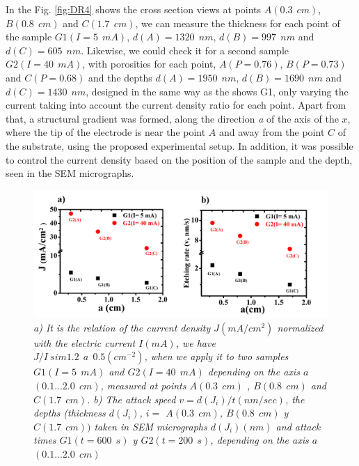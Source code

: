 \documentclass{article}
\begin{document}
In the Fig. \ref{fig:DR4} shows the cross section views   at points $
A (0.3 \ \ cm) $, $ B (0.8 \ \ cm) $ and $ C (1.7 \ \ cm) $, we can
measure the thickness for each point of the sample $ G1 (I = 5 \ \ mA)
$, $ d (A) = 1320 \ \ nm $, $ d (B) = 997 \ \ nm $ and $ d (C) = 605 \
\ nm $. Likewise, we could check it for a second sample $ G2 (I = 40 \
\ mA) $, with porosities for each point, $ A (P = 0.76) $, $ B (P =
0.73) $ and $ C (P = 0.68) $ and the depths $ d (A) = 1950 \ \ nm $, $
d (B) = 1690 \ \ nm $ and $ d (C) = 1430 \ \ nm $, designed in the
same way as the shows G1, only varying the current taking into account
the current density ratio for each point. Apart from that, a
structural gradient was formed, along the direction \emph{ a}  of the
axis of the $ x $, where the tip of the electrode is near the point $
A $ and away from the point $ C $ of the substrate, using the proposed
experimental setup. In addition, it was possible to control the
current density based on the position of the sample and the depth,
seen in the SEM micrographs.
 \begin{figure}
   \centering
   \includegraphics[scale=.7]{Images/grinJDR}
   \caption{\emph{a) It is the relation of the current density $
       J (mA / cm ^ 2) $ normalized with the electric current $ I
       (mA) $, we have $ J / I \ sim 1.2 \ \ a \ \ 0.5 ( cm^{-2})
       $, when we apply it to two samples $ G1 (I = 5 \ \ mA) $
       and $ G2 (I = 40 \ \ mA) $ depending on the axis $ a $ $
       (0.1 ... 2.0 \ \ cm) $, measured at points $ A (0.3 \ \
       cm) $ , $ B (0.8 \ \ cm) $ and $ C (1.7 \ \ cm) $. b) The
       attack speed $ v = d (J_i) / t (nm / sec) $, the depths
       (thickness $ d (J_i) $, $ i = $ $ A (0.3 \ \ cm) $, $ B (
       0.8 \ \ cm) $ y $ C (1.7 \ \ cm)) $ taken in SEM
       micrographs $ d (J_i) (nm) $ and attack times $ G1 (t =
       600 \ \ s) $ y $ G2 (t = 200 \ \ s) $, depending on the
       axis $ a $ $ (0.1 ... 2.0 \ \ cm) $ } }
   \label{fig:JDR}
 \end{figure}
\end{document}
